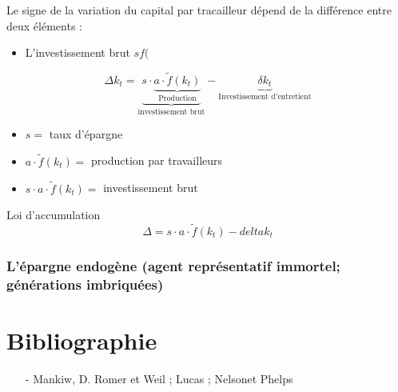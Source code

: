 \documentclass{article}
\begin{document}
Le signe de la variation du capital par tracailleur dépend de la différence entre deux éléments : 
\begin{itemize}
	\item L'investissement brut \(sf(\)
\end{itemize}

\[\Delta k_t = \underbrace{s \cdot \underbrace{a \cdot \tilde{f}(k_t)}_{\textrm{Production}}}_{\textrm{investissement brut}} - \underbrace{\delta k_t}_{\textrm{Investissement d'entretient}} \]

\begin{itemize}
	\item \(s = \) taux d'épargne
	\item \(a \cdot \tilde{f}(k_t) = \) production par travailleurs
	\item \(s \cdot a \cdot \tilde{f}(k_t) = \) investissement brut
\end{itemize}

Loi d'accumulation 
\[\Delta = s \cdot a \cdot \tilde{f}(k_t) - delta k_t\]


\subsubsection{L'épargne endogène (agent représentatif immortel; générations imbriquées)}

\section{Bibliographie}
\begin{itemize}
	\item[-] Mankiw, D. Romer et Weil ; Lucas ; Nelsonet Phelps
\end{itemize}
\end{document}
